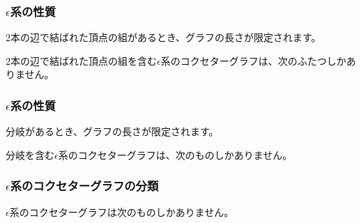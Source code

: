 \documentclass{beamer}
\begin{document}
\begin{frame}
    \frametitle{$ϵ$系の性質}

    2本の辺で結ばれた頂点の組があるとき、グラフの長さが限定されます。

    \begin{lemma}
        2本の辺で結ばれた頂点の組を含む$ϵ$系のコクセターグラフは、次のふたつしかありません。
        \begin{figure}
            \centering

        \end{figure}
    \end{lemma}
\end{frame}

\begin{frame}
    \frametitle{$ϵ$系の性質}

    分岐があるとき、グラフの長さが限定されます。

    \begin{lemma}
        分岐を含む$ϵ$系のコクセターグラフは、次のものしかありません。
        \begin{figure}
            \centering


        \end{figure}
    \end{lemma}
\end{frame}

\begin{frame}
    \frametitle{$ϵ$系のコクセターグラフの分類}

    \begin{theorem}
        $ϵ$系のコクセターグラフは次のものしかありません。
        \begin{figure}
            \centering





        \end{figure}
    \end{theorem}
\end{frame}
\end{document}
